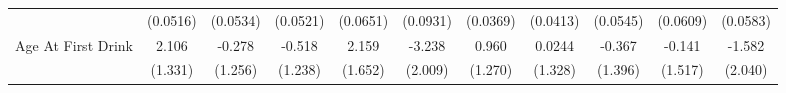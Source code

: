 {\begin{tabular}{l*{10}{c}}
            &    (0.0516)         &    (0.0534)         &    (0.0521)         &    (0.0651)         &    (0.0931)         &    (0.0369)         &    (0.0413)         &    (0.0545)         &    (0.0609)         &    (0.0583)         \\
\addlinespace
Age At First Drink&       2.106         &      -0.278         &      -0.518         &       2.159         &      -3.238         &       0.960         &      0.0244         &      -0.367         &      -0.141         &      -1.582         \\
            &     (1.331)         &     (1.256)         &     (1.238)         &     (1.652)         &     (2.009)         &     (1.270)         &     (1.328)         &     (1.396)         &     (1.517)         &     (2.040)         \\
\bottomrule
\end{tabular}
}
